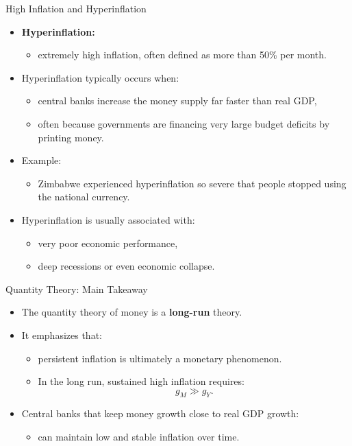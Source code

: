 \documentclass[aspectratio=169]{beamer}
\begin{document}
\begin{frame}{High Inflation and Hyperinflation}
\transfade
\begin{itemize}
  \item \textbf{Hyperinflation:}
  \begin{itemize}
    \item extremely high inflation, often defined as \alert{more than 50\% per month}.
  \end{itemize}
  \item Hyperinflation typically occurs when:
  \begin{itemize}
    \item central banks increase the money supply far faster than real GDP,
    \item often because governments are financing very large budget deficits by printing money.
  \end{itemize}
  \item Example:
  \begin{itemize}
    \item Zimbabwe experienced hyperinflation so severe that people stopped using the national currency.
  \end{itemize}
  \item Hyperinflation is usually associated with:
  \begin{itemize}
    \item very poor economic performance,
    \item deep recessions or even economic collapse.
  \end{itemize}
\end{itemize}
\end{frame}

\begin{frame}{Quantity Theory: Main Takeaway}
\transfade
\begin{itemize}
  \item The quantity theory of money is a \textbf{long-run} theory.
  \item It emphasizes that:
  \begin{itemize}
    \item \alert{persistent inflation} is ultimately a monetary phenomenon.
    \item In the long run, sustained high inflation requires:
    \[
      g_{M} \gg g_{Y}.
    \]
  \end{itemize}
  \item Central banks that keep money growth close to real GDP growth:
  \begin{itemize}
    \item can maintain low and stable inflation over time.
  \end{itemize}
\end{itemize}
\end{frame}
\end{document}
